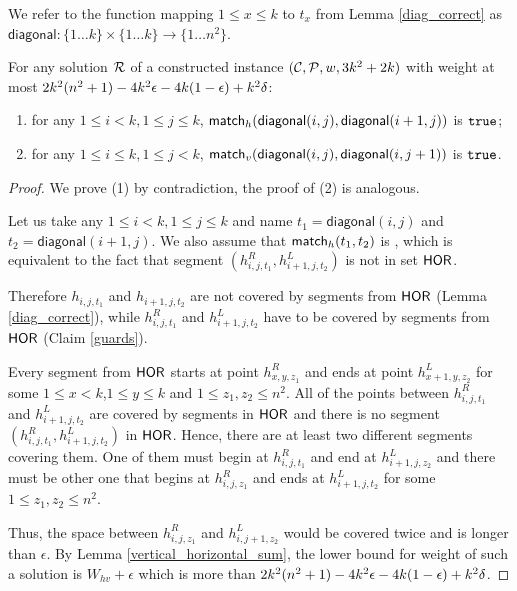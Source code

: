 {{{{\newcommand{\diagonal}{\mathsf{diagonal}}
We refer to the function mapping $1 \le x \le k$ to $t_x$ from Lemma \ref{diag_correct}
as $\diagonal : \{1 \ldots k\} \times \{1 \ldots k\} \rightarrow \{1 \ldots n^2\}$.

\begin{lemma}
\label{vertical_horizontal_synchronized}
For any solution $\mathcal{R}$
of a constructed instance $(\mathcal{C}, \mathcal{P}, w, 3k^2+2k)$
with weight at most $2k^2(n^2+1) - 4k^2\epsilon -4k(1-\epsilon) +k^2\delta$:
\begin{enumerate}
\item 
for any $1 \le i < k, 1 \le j \le k$,
$\matchh(\diagonal(i, j),\diagonal(i+1, j))$ is $\texttt{true}$;
\item 
for any $1 \le i \le k, 1 \le j < k$,
$\matchv(\diagonal(i, j),\diagonal(i, j+1))$ is $\texttt{true}$.
\end{enumerate}
\end{lemma}

\begin{proof}
We prove (1) by contradiction, the proof of (2) is analogous.

Let us take any $1 \le i < k, 1 \le j \le k$
and name $t_1 = \diagonal(i, j)$ and $t_2 = \diagonal(i+1, j)$.
We also assume that $\mathsf{match}_h(t_1,t_2)$ is \false,
which is equivalent to the fact that
segment $(h_{i,j,t_1}^R, h_{i+1,j,t_2}^L)$
is not in set $\mathsf{HOR}$.

Therefore $h_{i,j,t_1}$ and $h_{i+1,j,t_2}$
are not covered by segments from $\mathsf{HOR}$ (Lemma \ref{diag_correct}),
while $h^R_{i,j,t_1}$ and $h^L_{i+1,j,t_2}$
have to be covered by segments from $\mathsf{HOR}$ (Claim \ref{guards}).

Every segment from $\mathsf{HOR}$ starts at point $h^R_{x,y,z_1}$
and ends at point $h^L_{x+1,y,z_2}$ for some
$1 \le x < k$,$1 \le y \le k$ and $1 \le z_1, z_2 \le n^2$.
All of the points between $h^R_{i,j,t_1}$ and $h^L_{i+1,j,t_2}$
are covered by segments in $\mathsf{HOR}$ 
and there is no segment $(h^R_{i,j,t_1}, h^L_{i+1,j,t_2})$ in $\mathsf{HOR}$.
Hence, there are at least two different segments covering them.
One of them must begin
at $h^R_{i,j,t_1}$ and end at $h^L_{i+1,j,z_2}$
and there must be other one that begins at $h^R_{i,j,z_1}$
and ends at $h^L_{i+1,j,t_2}$
for some $1 \le z_1, z_2 \le n^2$.

Thus, the space between $h^R_{i,j,z_1}$ and $h^L_{i,j+1,z_2}$
would be covered twice and is longer than $\epsilon$.
By Lemma \ref{vertical_horizontal_sum},
the lower bound for weight of such a solution is $W_{hv} + \epsilon$
which is more than $2k^2(n^2+1) - 4k^2\epsilon -4k(1-\epsilon) +k^2\delta$.


\end{proof}}}}}
